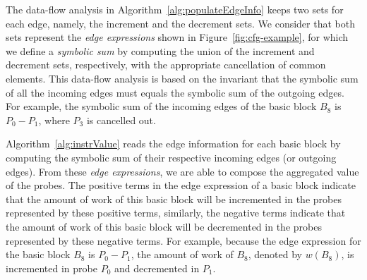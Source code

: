 \documentclass[sigplan,10pt]{acmart}
\theoremstyle{definition}
\begin{document}
The data-flow analysis in Algorithm~\ref{alg:populateEdgeInfo} keeps two sets for each edge, namely, the increment and the decrement sets.
We consider that both sets represent the \textit{edge expressions} shown in Figure~\ref{fig:cfg-example}, for which we define a \textit{symbolic sum} by computing the union of the increment and decrement sets, respectively, with the appropriate cancellation of common elements.
This data-flow analysis is based on the invariant that the symbolic sum of all the incoming edges must equals the symbolic sum of the outgoing edges.
For example, the symbolic sum of the incoming edges of the basic block $B_8$ is $P_0 - P_1$, where $P_3$ is cancelled out.


Algorithm~\ref{alg:instrValue} reads the edge information for each basic block by computing the symbolic sum of their respective incoming edges (or outgoing edges).
From these \textit{edge expressions}, we are able to compose the aggregated value of the probes.
The positive terms in the edge expression of a basic block indicate that the amount of work of this basic block will be incremented in the probes represented by these positive terms, similarly, the negative terms indicate that the amount of work of this basic block will be decremented in the probes represented by these negative terms.
For example, because the edge expression for the basic block $B_8$ is $P_0 - P_1$, the amount of work of $B_8$, denoted by $w(B_8)$, is incremented in probe $P_0$ and decremented in $P_1$.
\end{document}
